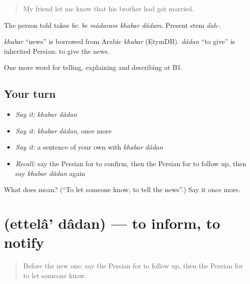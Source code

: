 \begin{quote}
My friend let me know that his brother had got married.
\end{quote}

The person told takes \emph{be}: \emph{be mâdaram khabar dâdam}. Present stem \emph{dah-}.

\begin{cousinweb}
\emph{khabar} \textquotedblleft{}news\textquotedblright{} is borrowed from Arabic \emph{khabar} (EtymDB). \emph{dâdan} \textquotedblleft{}to give\textquotedblright{} is inherited Persian: to give the news.
\end{cousinweb}

\begin{grammarlens}[title={What you've built}]
One more word for telling, explaining and describing at B1.
\end{grammarlens}

\subsection*{Your turn}
\begin{itemize}
\raggedright
  \item \emph{Say it:} \emph{khabar dâdan}
  \item \emph{Say it:} \emph{khabar dâdan}, once more
  \item \emph{Say it:} a sentence of your own with \emph{khabar dâdan}
  \item \emph{Recall:} say the Persian for to confirm, then the Persian for to follow up, then say \emph{khabar dâdan} again
\end{itemize}

\begin{tcolorbox}[breakable,colback=teal!4,colframe=teal!35!black,title={Before you move on}]
What does   mean? (\textquotedblleft{}To let someone know, to tell the news\textquotedblright{}.) Say it once more.
\end{tcolorbox}
\section[\texorpdfstring{\fa{اطلاع} \fa{دادن} (ettelâ' dâdan)}{اطلاع دادن (ettelâ' dâdan)}]{  (ettelâ' dâdan) — to inform, to notify}

\label{lesson:FA-C310-ettela-dadan}



\begin{quote}
Before the new one: say the Persian for to follow up, then the Persian for to let someone know.
\end{quote}

